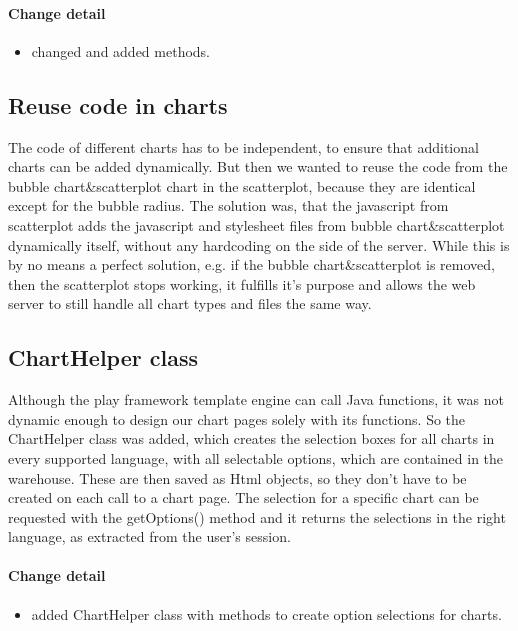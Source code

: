 \paragraph{Change detail}
\begin{itemize}
  \item changed and added methods.
\end{itemize}

\pagebreak[4]
\subsection{Reuse code in charts}
The code of different charts has to be independent, to ensure that additional charts can be added dynamically.
But then we wanted to reuse the code from the bubble chart\&scatterplot chart in the scatterplot, 
because they are identical except for the bubble radius. 
The solution was, that the javascript from scatterplot adds the javascript 
and stylesheet files from bubble chart\&scatterplot dynamically itself, without any hardcoding on the side of the server. 
While this is by no means a perfect solution, e.g. if the bubble chart\&scatterplot is removed, then the scatterplot stops working,
it fulfills it's purpose and allows the web server to still handle all chart types and files the same way.

\subsection{ChartHelper class}
Although the play framework template engine can call Java functions, it was not dynamic 
enough to design our chart pages solely with its functions.
So the ChartHelper class was added, which creates the selection boxes for all charts in every supported language, 
with all selectable options, which are contained in the warehouse.
These are then saved as Html objects, so they don't have to be created on each call to a chart page.
The selection for a specific chart can be requested with the getOptions() 
method and it returns the selections in the right language,
as extracted from the user's session.

\paragraph{Change detail}
\begin{itemize}
  \item added ChartHelper class with methods to create option selections for charts.
\end{itemize}

